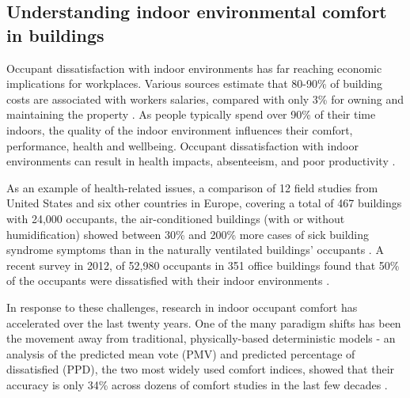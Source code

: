 \documentclass[]{interact}
\theoremstyle{plain}%
\theoremstyle{definition}
\theoremstyle{remark}
\begin{document}
  





\subsection{Understanding indoor environmental comfort in buildings}
Occupant dissatisfaction with indoor environments has far reaching economic implications for workplaces. Various sources estimate that 80-90\% of building costs are associated with workers salaries, compared with only 3\% for owning and maintaining the property \citep{Creativeandproductiveworkplaces, kats2003green, wilson2005making}. As people typically spend over 90\% of their time indoors, the quality of the indoor environment influences their comfort, performance, health and wellbeing. Occupant dissatisfaction with indoor environments can result in health impacts, absenteeism, and poor productivity \citep{MiltonDonaldK.P.MarkGlencross2000}.

As an example of health-related issues, a comparison of 12 field studies from United States and six other countries in Europe, covering a total of 467 buildings with 24,000 occupants, the air-conditioned buildings (with or without humidification) showed between 30\% and 200\% more cases of sick building syndrome symptoms than in the naturally ventilated buildings' occupants \citep{Evolvingopportunities, ventilationsystemtype}. A recent survey in 2012, of 52,980 occupants in 351 office buildings found that 50\% of the occupants were dissatisfied with their indoor environments \citep{Frontczak2012QuantitativeDesign}. 


In response to these challenges, research in indoor occupant comfort has accelerated over the last twenty years. One of the many paradigm shifts has been the movement away from traditional, physically-based deterministic models - an analysis of the predicted mean vote (PMV) and predicted percentage of dissatisfied (PPD), the two most widely used comfort indices, showed that their accuracy is only 34\% across dozens of comfort studies in the last few decades \cite{CHEUNG2019205,FOLDVARYLICINA2018502}.
 
\end{document}
